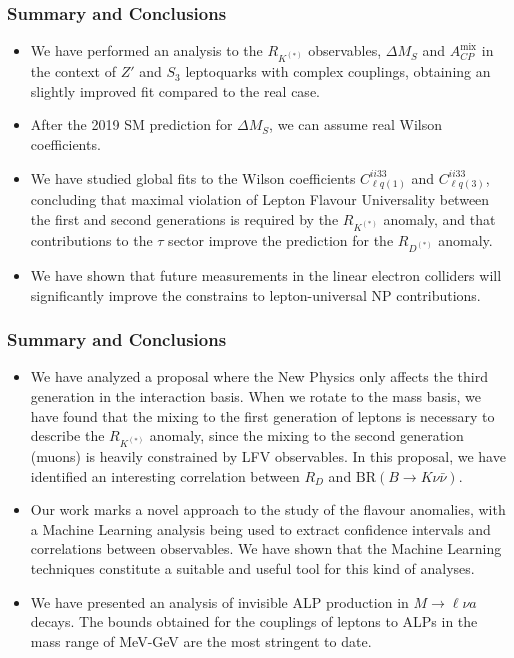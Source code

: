 \documentclass[mathserif, 10pt, dvipsnames]{beamer}
\begin{document}
\begin{frame}\frametitle{Summary and Conclusions}
    \begin{itemize}
\item We have performed an analysis to the $R_{K^{(*)}}$ observables, $\Delta M_S$ and $A_{CP}^\mathrm{mix}$ in the context of $Z'$ and $S_3$ leptoquarks with complex couplings, obtaining an slightly improved fit compared to the real case.
        \item After the 2019 SM prediction for $\Delta M_S$, we can assume real Wilson coefficients.
        \item We have studied global fits to the Wilson coefficients $C_{\ell q(1)}^{ii33}$ and $C_{\ell q(3)}^{ii33}$, concluding that maximal violation of Lepton Flavour Universality between the first and second generations is required by the $R_{K^{(*)}}$ anomaly, and that contributions to the $\tau$ sector improve the prediction for the $R_{D^{(*)}}$ anomaly.
        \item We have shown that future measurements in the linear electron colliders will significantly improve the constrains to lepton-universal NP contributions.
    \end{itemize}

\end{frame}

\begin{frame}\frametitle{Summary and Conclusions}
    \begin{itemize}
\item We have analyzed a proposal where the New Physics only affects the third generation in the interaction basis. When we rotate to the mass basis, we have found that the mixing to the first generation of leptons is necessary to describe the $R_{K^{(*)}}$ anomaly, since the mixing to the second generation (muons) is heavily constrained by LFV observables. In this proposal, we have identified an interesting correlation between $R_D$ and $\mathrm{BR}(B\to K \nu \bar{\nu})$.
        \item  Our work marks a novel approach to the study of the flavour anomalies, with a Machine Learning analysis being used to extract confidence intervals and correlations
              between observables. We have shown that the Machine Learning techniques constitute a suitable and useful tool for this kind of analyses.
        \item We have presented an analysis of invisible ALP production in $M\to \ell \nu a$ decays. The bounds obtained for the couplings of leptons to ALPs in the mass range of MeV-GeV are the most stringent to date.
    \end{itemize}
\end{frame}
\end{document}

